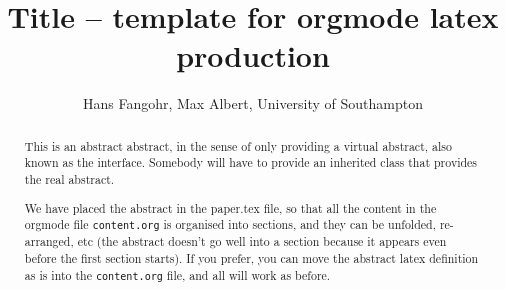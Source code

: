 \documentclass{article}
\begin{document}
\title{\sffamily \textbf{Title -- template for orgmode latex production}}

\author{Hans Fangohr, Max Albert, University of Southampton}

\maketitle

\begin{abstract}
  This is an abstract abstract, in the sense of only providing a
  virtual abstract, also known as the interface. Somebody will have to
  provide an inherited class that provides the real abstract.

  We have placed the abstract in the paper.tex file, so that all the
  content in the orgmode file \texttt{content.org} is organised into
  sections, and they can be unfolded, re-arranged, etc (the abstract
  doesn't go well into a section because it appears even before the
  first section starts). If you prefer, you can move the abstract
  latex definition as is into the \texttt{content.org} file, and all
  will work as before.
\end{abstract}







\end{document}
